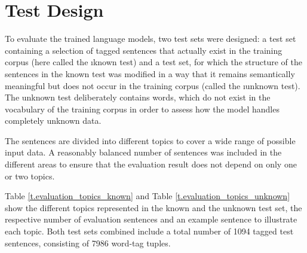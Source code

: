 \section{Test Design}\label{c.evaluation.test}
To evaluate the trained language models, two test sets were designed: a test set containing a selection of tagged sentences that actually exist in the training corpus (here called the \i{known test}) and a test set, for which the structure of the sentences in the known test was modified in a way that it remains semantically meaningful but does not occur in the training corpus (called the \i{unknown test}). The unknown test deliberately contains words, which do not exist in the vocabulary of the training corpus in order to assess how the model handles completely unknown data.

The sentences are divided into different topics to cover a wide range of possible input data. A reasonably balanced number of sentences was included in the different areas to ensure that the evaluation result does not depend on only one or two topics.

Table \ref{t.evaluation_topics_known} and Table \ref{t.evaluation_topics_unknown} show the different topics represented in the known and the unknown test set, the respective number of evaluation sentences and an example sentence to illustrate each topic. Both test sets combined include a total number of 1094 tagged test sentences, consisting of 7986 word-tag tuples.

